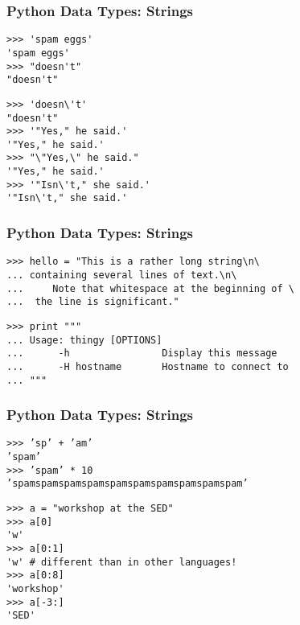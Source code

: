 \begin{frame}[fragile]
    \frametitle{Python Data Types: Strings}
    \begin{myColorBox}{0.9}{}
\begin{verbatim}
>>> 'spam eggs'
'spam eggs'
>>> "doesn't"
"doesn't"
\end{verbatim}
    \end{myColorBox}
    \pause
    \begin{myColorBox}{0.9}{}
\begin{verbatim}
>>> 'doesn\'t'
"doesn't"
>>> '"Yes," he said.'
'"Yes," he said.'
>>> "\"Yes,\" he said."
'"Yes," he said.'
>>> '"Isn\'t," she said.'
'"Isn\'t," she said.'
\end{verbatim}
    \end{myColorBox}
\end{frame}


\begin{frame}[fragile]
    \frametitle{Python Data Types: Strings}
    \begin{myColorBox}{0.9}{}
\begin{verbatim}
>>> hello = "This is a rather long string\n\
... containing several lines of text.\n\
...     Note that whitespace at the beginning of \
...  the line is significant."
\end{verbatim}
    \end{myColorBox}
    \pause
    \begin{myColorBox}{0.9}{}
\begin{verbatim}
>>> print """
... Usage: thingy [OPTIONS]
...      -h                Display this message
...      -H hostname       Hostname to connect to
... """
\end{verbatim}
    \end{myColorBox}
\end{frame}


\begin{frame}[fragile]
    \frametitle{Python Data Types: Strings}
    \begin{myColorBox}{0.9}{}
\begin{verbatim}
>>> ’sp’ + ’am’
’spam’
>>> ’spam’ * 10
’spamspamspamspamspamspamspamspamspamspam’
\end{verbatim}
    \end{myColorBox}
    \pause
    \begin{myColorBox}{0.9}{}
\begin{verbatim}
>>> a = "workshop at the SED"
>>> a[0]
'w'
>>> a[0:1]
'w' # different than in other languages!
>>> a[0:8]
'workshop'
>>> a[-3:]
'SED'
\end{verbatim}
    \end{myColorBox}
\end{frame}


